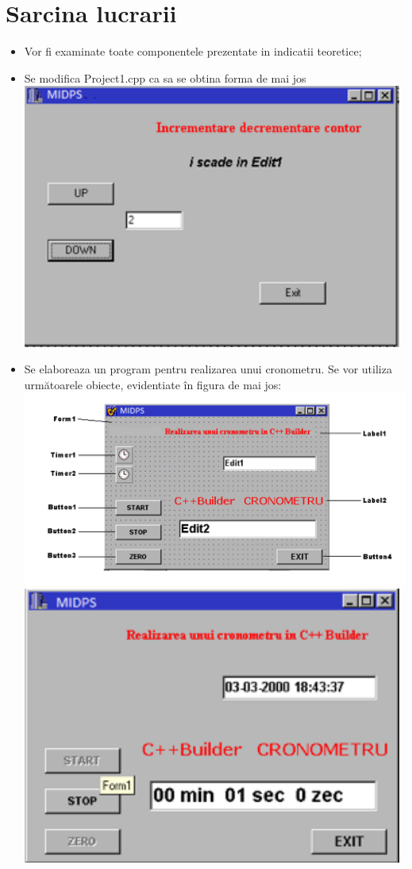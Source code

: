 \documentclass[12pt]{article}
\begin{document}
\section* {Sarcina lucrarii}
\begin{itemize}
\item Vor fi examinate toate componentele prezentate in indicatii teoretice;
\item Se modifica Project1.cpp ca sa se obtina forma de mai jos\\
\includegraphics[width=12.5cm]{images/1}
\item Se  elaboreaza  un program pentru realizarea unui cronometru.
Se vor utiliza următoarele obiecte, evidentiate în figura de mai jos:
\\
\includegraphics[width=16cm]{images/2}
\includegraphics[width=12.5cm]{images/3}\\

\end{itemize}
\end{document}
